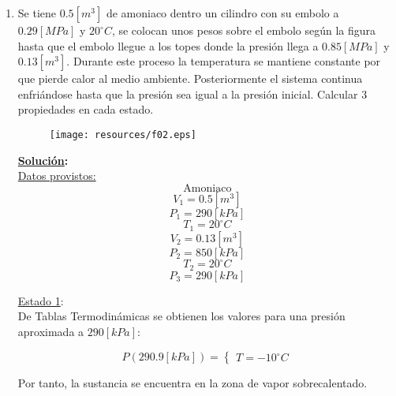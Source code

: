 \documentclass[letter,11pt]{article}
\begin{document}
\begin{enumerate}
\item Se tiene $0.5[m^3]$ de amoniaco dentro un cilindro con su embolo a
$0.29[MPa]$ y $20^\circ C$, se colocan unos pesos sobre el embolo según la
figura hasta que el embolo llegue a los topes donde la presión llega a
$0.85[MPa]$ y $0.13[m^3]$. Durante este proceso la temperatura se mantiene
constante por que pierde calor al medio ambiente. Posteriormente el sistema
continua enfriándose hasta que la presión sea igual a la presión inicial.
Calcular 3 propiedades en cada estado.

\begin{figure}[H]
\centering
\texttt{[image: resources/f02.eps]}
\end{figure}

\textbf{\underline{Solución}:} \\

\underline{Datos provistos:}
\begin{equation*}
    \text{Amoniaco}
\end{equation*}
\begin{equation*}
    V_1 = 0.5[m^3]
\end{equation*}
\begin{equation*}
    P_1 = 290[kPa]
\end{equation*}
\begin{equation*}
    T_1 = 20^\circ C
\end{equation*}
\begin{equation*}
    V_2 = 0.13[m^3]
\end{equation*}
\begin{equation*}
    P_2=850[kPa]
\end{equation*}
\begin{equation*}
    T_2=20^\circ C
\end{equation*}
\begin{equation*}
    P_3=290[kPa]
\end{equation*}

\underline{Estado 1}: \\
De Tablas Termodinámicas se obtienen los valores para una presión aproximada a
$290[kPa]$:

\begin{equation*}
    P(290.9[kPa]) = \begin{cases}
        T = -10^\circ C
    \end{cases}
\end{equation*}

Por tanto, la sustancia se encuentra en la zona de vapor sobrecalentado.


\end{enumerate}
\end{document}
